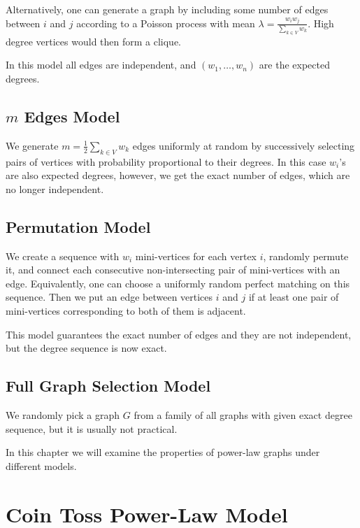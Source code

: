 Alternatively, one can generate a graph by including some number of edges between $i$ and $j$
according to a Poisson process with mean $\lambda=\frac{w_i w_j}{\sum_{k\in V}{w_k}}$.
High degree vertices would then form a clique.

In this model all edges are independent, and $(w_1,\ldots,w_n)$ are the expected degrees.

\subsection{\texorpdfstring{$m$}{m} Edges Model}

We generate $m=\frac{1}{2}\sum_{k\in V}{w_k}$ edges uniformly at random
by successively selecting pairs of vertices with probability proportional to their degrees.
In this case $w_i$'s are also expected degrees, however, we get
the exact number of edges, which are no longer independent.

\subsection{Permutation Model}
\label{subsec:permutation-model}

We create a sequence with $w_i$ mini-vertices for each vertex $i$,
randomly permute it, and connect each consecutive
non-intersecting pair of mini-vertices with an edge.
Equivalently, one can choose a uniformly random perfect matching on this sequence.
Then we put an edge between vertices $i$ and $j$ if at least one pair
of mini-vertices corresponding to both of them is adjacent.

This model guarantees the exact number of edges and they are not independent,
but the degree sequence is now exact.

\subsection{Full Graph Selection Model}

We randomly pick a graph $G$ from a family of all graphs with given
exact degree sequence, but it is usually not practical.

In this chapter we will examine the properties of power-law graphs under different models.

\section{Coin Toss Power-Law Model}
\label{sec:powerlaw-coin-toss-model}

